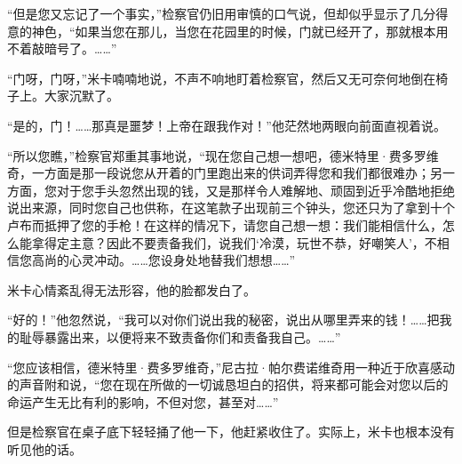 \par “但是您又忘记了一个事实，”检察官仍旧用审慎的口气说，但却似乎显示了几分得意的神色，“如果当您在那儿，当您在花园里的时候，门就已经开了，那就根本用不着敲暗号了。……”
\par “门呀，门呀，”米卡喃喃地说，不声不响地盯着检察官，然后又无可奈何地倒在椅子上。大家沉默了。
\par “是的，门！……那真是噩梦！上帝在跟我作对！”他茫然地两眼向前面直视着说。
\par “所以您瞧，”检察官郑重其事地说，“现在您自己想一想吧，德米特里·费多罗维奇，一方面是那一段说您从开着的门里跑出来的供词弄得您和我们都很难办；另一方面，您对于您手头忽然出现的钱，又是那样令人难解地、顽固到近乎冷酷地拒绝说出来源，同时您自己也供称，在这笔款子出现前三个钟头，您还只为了拿到十个卢布而抵押了您的手枪！在这样的情况下，请您自己想一想：我们能相信什么，怎么能拿得定主意？因此不要责备我们，说我们‘冷漠，玩世不恭，好嘲笑人’，不相信您高尚的心灵冲动。……您设身处地替我们想想……”
\par 米卡心情紊乱得无法形容，他的脸都发白了。
\par “好的！”他忽然说，“我可以对你们说出我的秘密，说出从哪里弄来的钱！……把我的耻辱暴露出来，以便将来不致责备你们和责备我自己。……”
\par “您应该相信，德米特里·费多罗维奇，”尼古拉·帕尔费诺维奇用一种近于欣喜感动的声音附和说，“您在现在所做的一切诚恳坦白的招供，将来都可能会对您以后的命运产生无比有利的影响，不但对您，甚至对……”
\par 但是检察官在桌子底下轻轻捅了他一下，他赶紧收住了。实际上，米卡也根本没有听见他的话。

